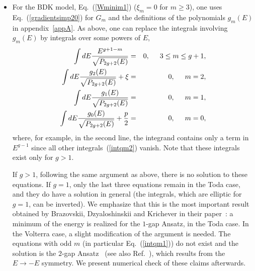 \documentclass[]{revtex4-1}
\begin{document}
\begin{itemize} \item For the BDK model, Eq.~(\ref{Wminim1}) ($\xi_m=0$ for $m \geq 3$), one uses Eq.~(\ref{gradientsimp20}) for $G_m$ and the definitions of the polynomials $g_m(E)$ in appendix~\ref{appA}. As above, one can replace the integrals involving $g_m(E)$ by integrals over some powers of $E$, 
\begin{eqnarray}
   \int dE \frac{E^{g+1-m}}{\sqrt{P_{2g+2}(E)}} &=& 0, \hspace{.5cm} 3 \leq m \leq g+1, \label{intqm2} \\
 \int dE \frac{  g_2(E) }{\sqrt{P_{2g+2}(E)}} +\xi &=& 0,  \hspace{.5cm} m=2, \\
  \int dE \frac{ g_1(E) }{\sqrt{P_{2g+2}(E)}} &=& 0,  \hspace{.5cm} m=1, \label{intqm1}\\
  \int dE \frac{ g_0(E) }{\sqrt{P_{2g+2}(E)}} + \frac{p}{2} &=& 0,  \hspace{.5cm} m=0,  \label{intqm}
 \end{eqnarray}
where, for example, in the second line, the integrand contains only a term in $E^{g-1}$ since all other integrals~(\ref{intqm2})  vanish. Note that these integrals exist only for $g>1$. %

If $g>1$, following the same argument as above, there is no solution to these equations.  If $g=1$, only the last three equations remain in the Toda case, and they do have a solution in general (the integrals, which are elliptic for $g=1$, can be inverted). We emphasize that this is the most important result obtained by Brazovskii, Dzyaloshinskii and Krichever in their paper~\cite{BDK}: a minimum of the energy is realized for the $1$-gap Ansatz, in the Toda case. In the Volterra case, a slight modification of the argument is needed. The equations with odd $m$ (in particular Eq.~(\ref{intqm1})) do not exist and the solution is the $2$-gap Ansatz~\cite{BDK} (see also Ref.~\cite{Gordjunin}), which results from the $E \rightarrow -E$ symmetry. We present numerical check of these claims afterwards.


\end{itemize}
\end{document}
